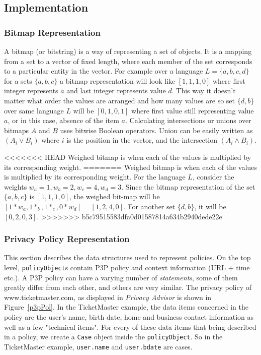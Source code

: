 \subsection{Implementation}

\subsubsection{Bitmap Representation}
A bitmap (or bitstring) is a way of representing a set of objects. It is a mapping from a set to a vector of fixed length, where each member of the set corresponds to a particular entity in the vector. For example over a language $L=\{a,b,c,d\}$ for a sets $\{a,b,c\}$ a bitmap representation will look like $[1, 1, 1, 0]$ where first integer represents $a$ and last integer represents value $d$. This way it doesn't matter what order the values are arranged and how many values are so set $\{d,b\}$ over same language $L$ will be $[0, 1, 0, 1]$ where first value still representing value $a$, or in this case, absence of the item $a$. Calculating intersections or unions over bitmaps $A$ and $B$ uses bitwise Boolean operators. Union can be easily written as $(A_i \vee B_i)$ where $i$ is the position in the vector, and the intersection $(A_i \wedge B_i)$.

<<<<<<< HEAD
Weighed bitmap is when each of the values is multiplied by its corresponding weight.
=======
Weighed bitmap is when each of the values is multiplied by its corresponding weight. For the language $L$, consider the weights $w_a=1, w_b=2, w_c=4, w_d=3$. Since the bitmap representation of the set $\{a,b,c\}$ is $[1, 1, 1, 0]$, the weighed bit-map will be $[1*w_a, 1*_b, 1*_c, 0*w_d]=[1, 2, 4, 0]$. For another set $\{d,b\}$, it will be $[0, 2, 0, 3]$.
>>>>>>> b5c79515583dfa0d01587814a634b2940dede22e

\subsubsection{Privacy Policy Representation}

This section describes the data structures used to represent policies. On the top level, \texttt{policyObject}s contain P3P policy and context information (URL + time etc.). A P3P policy can have a varying number of \emph{statements}, some of them greatly differ from each other, and others are very similar. The privacy policy of www.ticketmaster.com, as displayed in \emph{Privacy Advisor} is shown in Figure~\ref{p3pPol}. In the TicketMaster example, the data items concerned in the policy are the user's name, birth date, home and business contact information as well as a few "technical items". For every of these data items that being described in a policy, we create a \texttt{Case} object inside the \texttt{policyObject}. So in the TicketMaster example, \texttt{user.name} and \texttt{user.bdate} are cases.

